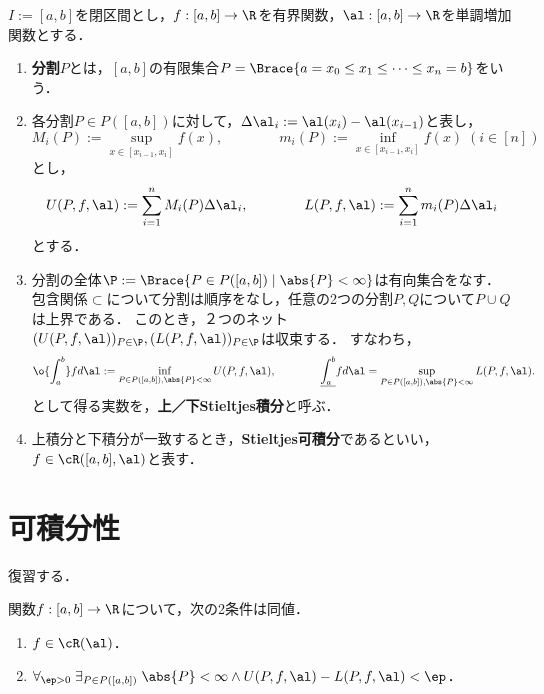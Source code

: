 \documentclass[uplatex, dvipdfmx]{jsreport}
\begin{document}
\begin{definition}
    $I:=[a,b]$を閉区間とし，$f:[a,b]\to\R$を有界関数，$\al:[a,b]\to\R$を単調増加関数とする．
    \begin{enumerate}
        \item \textbf{分割}$P$とは，$[a,b]$の有限集合$P=\Brace{a=x_0\le x_1\le\cdots\le x_n=b}$をいう．
        \item 各分割$P\in P([a,b])$に対して，$\Delta\al_i:=\al(x_i)-\al(x_{i-1})$と表し，
        \[M_i(P):=\sup_{x\in[x_{i-1},x_i]}f(x),\qquad\qquad m_i(P):=\inf_{x\in[x_{i-1},x_i]}f(x)\;(i\in[n])\]
        とし，
        \[U(P,f,\al):=\sum^n_{i=1}M_i(P)\Delta\al_i,\qquad\qquad L(P,f,\al):=\sum^n_{i=1}m_i(P)\Delta\al_i\]
        とする．
        \item 分割の全体$\P:=\Brace{P\in P([a,b])\mid\abs{P}<\infty}$は有向集合をなす．包含関係$\subset$について分割は順序をなし，任意の2つの分割$P,Q$について$P\cup Q$は上界である．
        このとき，２つのネット$(U(P,f,\al))_{P\in\P},(L(P,f,\al))_{P\in\P}$は収束する．
        すなわち，
        \[\o{\int^b_a}fd\al:=\inf_{P\in P([a,b]),\abs{P}<\infty}U(P,f,\al),\qquad\qquad\underline{\int^b_a}fd\al=\sup_{P\in P([a,b]),\abs{P}<\infty}L(P,f,\al).\]
        として得る実数を，\textbf{上／下Stieltjes積分}と呼ぶ．
        \item 上積分と下積分が一致するとき，\textbf{Stieltjes可積分}であるといい，$f\in\cR([a,b],\al)$と表す．
    \end{enumerate}
\end{definition}

\section{可積分性}

\begin{tcolorbox}[colframe=ForestGreen, colback=ForestGreen!10!white,breakable,colbacktitle=ForestGreen!40!white,coltitle=black,fonttitle=\bfseries\sffamily,
title=]
    復習する．
\end{tcolorbox}

\begin{theorem}[可積分性の特徴付け]
    関数$f:[a,b]\to\R$について，次の2条件は同値．
    \begin{enumerate}
        \item $f\in\cR(\al)$．
        \item $\forall_{\ep>0}\;\exists_{P\in P([a,b])}\;\abs{P}<\infty\land U(P,f,\al)-L(P,f,\al)<\ep$．
    \end{enumerate}
\end{theorem}
\end{document}
